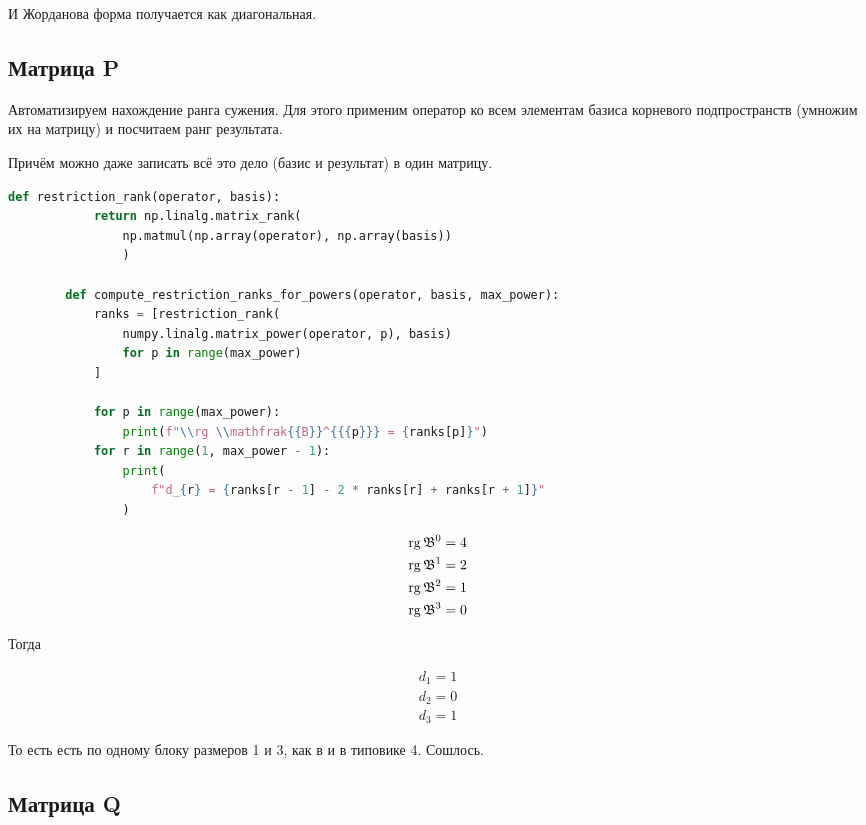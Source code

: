 \documentclass[12pt, a4paper]{article}
\begin{document}
    И Жорданова форма получается как диагональная.


    \subsection{Матрица P}

    Автоматизируем нахождение ранга сужения. 
    Для этого применим оператор ко всем элементам базиса корневого подпространств (умножим их на матрицу) 
    и посчитаем ранг результата.

    Причём можно даже записать всё это дело (базис и результат) в один матрицу.

    
    \begin{lstlisting}[language=Python]
        def restriction_rank(operator, basis):
            return np.linalg.matrix_rank(
                np.matmul(np.array(operator), np.array(basis))
                )
        
        def compute_restriction_ranks_for_powers(operator, basis, max_power):
            ranks = [restriction_rank(
                numpy.linalg.matrix_power(operator, p), basis) 
                for p in range(max_power)
            ]

            for p in range(max_power):
                print(f"\\rg \\mathfrak{{B}}^{{{p}}} = {ranks[p]}")
            for r in range(1, max_power - 1):
                print(
                    f"d_{r} = {ranks[r - 1] - 2 * ranks[r] + ranks[r + 1]}"
                )            
    \end{lstlisting}


    \begin{gather}
        \operatorname{rg} \mathfrak{B}^{0} = 4 \\
        \operatorname{rg} \mathfrak{B}^{1} = 2 \\
        \operatorname{rg} \mathfrak{B}^{2} = 1 \\
        \operatorname{rg} \mathfrak{B}^{3} = 0
    \end{gather}

    Тогда 

    \begin{gather}
        d_1 = 1 \\
        d_2 = 0 \\
        d_3 = 1
    \end{gather}

    То есть есть по одному блоку размеров 1 и 3, как в и в типовике 4. Сошлось.

    \subsection{Матрица Q}
\end{document}
